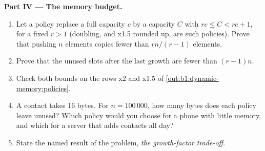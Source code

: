 \begin{problem}
\medskip\noindent\textbf{Part IV --- The memory budget.}
\begin{enumerate}[resume]
\item Let a policy replace a full capacity $c$ by a capacity $C$ with $rc \leq C < rc + 1$, for a fixed $r > 1$ (doubling,
and x1.5 rounded up, are such policies). Prove that pushing $n$ elements copies fewer than $rn/(r-1)$ elements.
\item Prove that the unused slots after the last growth are fewer than $(r-1)n$.
\item Check both bounds on the rows x2 and x1.5 of \cref{out:b1:dynamic-memory:policies}.
\item A contact takes 16 bytes. For $n = 100\,000$, how many bytes does each policy leave unused? Which policy would you
choose for a phone with little memory, and which for a server that adds contacts all day?
\item State the named result of the problem, \emph{the growth-factor trade-off}.
\end{enumerate}
\end{problem}
